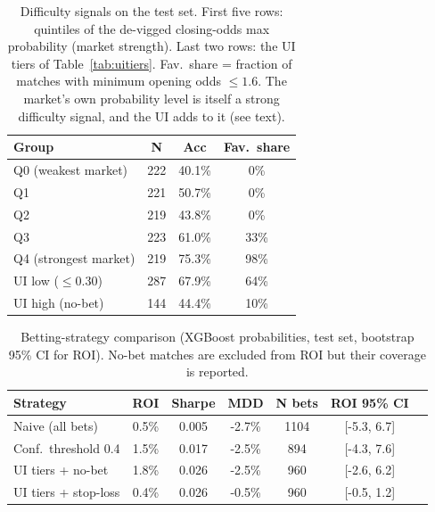 \documentclass[10pt]{article}
\begin{document}
\begin{table}[htbp]
\centering
\caption{Difficulty signals on the test set. First five rows: quintiles of the
de-vigged closing-odds max probability (market strength). Last two rows: the UI
tiers of Table~\ref{tab:uitiers}. Fav.\ share = fraction of matches with
minimum opening odds $\le 1.6$. The market's own probability level is itself a
strong difficulty signal, and the UI adds to it (see text).}
\label{tab:diff}
\small
\begin{tabular}{lccc}
\toprule
Group & N & Acc & Fav.\ share \\
\midrule
Q0 (weakest market) & 222 & 40.1\% & 0\% \\
Q1 & 221 & 50.7\% & 0\% \\
Q2 & 219 & 43.8\% & 0\% \\
Q3 & 223 & 61.0\% & 33\% \\
Q4 (strongest market) & 219 & 75.3\% & 98\% \\
\midrule
UI low ($\le$0.30) & 287 & 67.9\% & 64\% \\
UI high (no-bet) & 144 & 44.4\% & 10\% \\
\bottomrule
\end{tabular}
\end{table}

\begin{table}[htbp]
\centering
\caption{Betting-strategy comparison (XGBoost probabilities, test set,
bootstrap 95\% CI for ROI). No-bet matches are excluded from ROI but their
coverage is reported.}
\label{tab:strategy}
\begin{tabular}{lcccccc}
\toprule
Strategy & ROI & Sharpe & MDD & N bets & ROI 95\% CI \\
\midrule
Naive (all bets) & 0.5\% & 0.005 & -2.7\% & 1104 & [-5.3, 6.7] \\
Conf.\ threshold 0.4 & 1.5\% & 0.017 & -2.5\% & 894 & [-4.3, 7.6] \\
UI tiers + no-bet & 1.8\% & 0.026 & -2.5\% & 960 & [-2.6, 6.2] \\
UI tiers + stop-loss & 0.4\% & 0.026 & -0.5\% & 960 & [-0.5, 1.2] \\
\bottomrule
\end{tabular}
\end{table}
\end{document}

